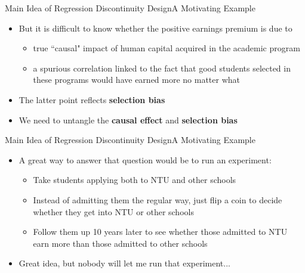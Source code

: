 \documentclass[dvipsnames,hyperref={pdfpagelabels=false}]{beamer}
\begin{document}
	
	
	
	\begin{frame}{Main Idea of Regression Discontinuity Design}{A Motivating Example}
		\begin{itemize}
			
			\item But it is difficult to know whether the positive earnings premium is
			due to
			\vspace{0.2cm}
			\begin{itemize}
				
				\item true ``causal" impact of human capital acquired in the academic program
				\vspace{0.2cm}
				\item a spurious correlation linked to the fact that good students selected in these
				programs would have earned more no matter what
				\vspace{0.2cm}
			\end{itemize}
			\item The latter point reflects \textbf{selection bias}
			\vspace{0.2cm}
			\item We need to untangle the \textbf{causal effect} and \textbf{selection bias}
			
		\end{itemize}
	\end{frame}
	
	
	\begin{frame}{Main Idea of Regression Discontinuity Design}{A Motivating Example}
		\begin{itemize}
			
			
			\item A great way to answer that question would be to run an experiment:
			\vspace{0.2cm}
			\begin{itemize}
				\item Take students applying both to NTU and other schools
				\vspace{0.2cm}
				\item Instead of admitting them the regular way, just flip a coin to decide whether they
				get into NTU or other schools
				\vspace{0.2cm}
				\item Follow them up 10 years later to see whether those admitted to NTU earn more than those admitted to other schools
				\vspace{0.2cm}
			\end{itemize}
			
			\item Great idea, but nobody will let me run that experiment...
			
			
		\end{itemize}
	\end{frame}
	
\end{document}
